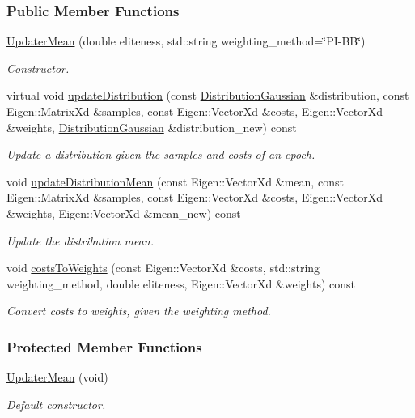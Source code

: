 \subsubsection*{Public Member Functions}
\begin{DoxyCompactItemize}
\item 
\hyperlink{classDmpBbo_1_1UpdaterMean_a8164afea816503cb4179eb65145947da}{Updater\+Mean} (double eliteness, std\+::string weighting\+\_\+method=\char`\"{}P\+I-\/B\+B\char`\"{})
\begin{DoxyCompactList}\small\item\em Constructor. \end{DoxyCompactList}\item 
virtual void \hyperlink{classDmpBbo_1_1UpdaterMean_aabb65aaf08049416ed18b294d5fca415}{update\+Distribution} (const \hyperlink{classDmpBbo_1_1DistributionGaussian}{Distribution\+Gaussian} \&distribution, const Eigen\+::\+Matrix\+Xd \&samples, const Eigen\+::\+Vector\+Xd \&costs, Eigen\+::\+Vector\+Xd \&weights, \hyperlink{classDmpBbo_1_1DistributionGaussian}{Distribution\+Gaussian} \&distribution\+\_\+new) const 
\begin{DoxyCompactList}\small\item\em Update a distribution given the samples and costs of an epoch. \end{DoxyCompactList}\item 
void \hyperlink{classDmpBbo_1_1UpdaterMean_a97c2ddfabeee67dba0044f405f4ce8c0}{update\+Distribution\+Mean} (const Eigen\+::\+Vector\+Xd \&mean, const Eigen\+::\+Matrix\+Xd \&samples, const Eigen\+::\+Vector\+Xd \&costs, Eigen\+::\+Vector\+Xd \&weights, Eigen\+::\+Vector\+Xd \&mean\+\_\+new) const 
\begin{DoxyCompactList}\small\item\em Update the distribution mean. \end{DoxyCompactList}\item 
void \hyperlink{classDmpBbo_1_1UpdaterMean_a67bb3ad0e7d34b11aa5453adc462f9cc}{costs\+To\+Weights} (const Eigen\+::\+Vector\+Xd \&costs, std\+::string weighting\+\_\+method, double eliteness, Eigen\+::\+Vector\+Xd \&weights) const 
\begin{DoxyCompactList}\small\item\em Convert costs to weights, given the weighting method. \end{DoxyCompactList}\end{DoxyCompactItemize}
\subsubsection*{Protected Member Functions}
\begin{DoxyCompactItemize}
\item 
\hyperlink{classDmpBbo_1_1UpdaterMean_a005e77ab55b2412bb2172b52bf263570}{Updater\+Mean} (void)
\begin{DoxyCompactList}\small\item\em Default constructor. \end{DoxyCompactList}\end{DoxyCompactItemize}

